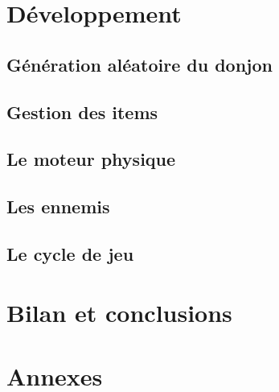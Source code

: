 \documentclass[a4paper,11pt]{article}
\begin{document}
\section{Développement}

\subsection{Génération aléatoire du donjon}

\subsection{Gestion des items}

\subsection{Le moteur physique}

\subsection{Les ennemis}

\subsection{Le cycle de jeu}

\section{Bilan et conclusions}

\section{Annexes}
\end{document}

